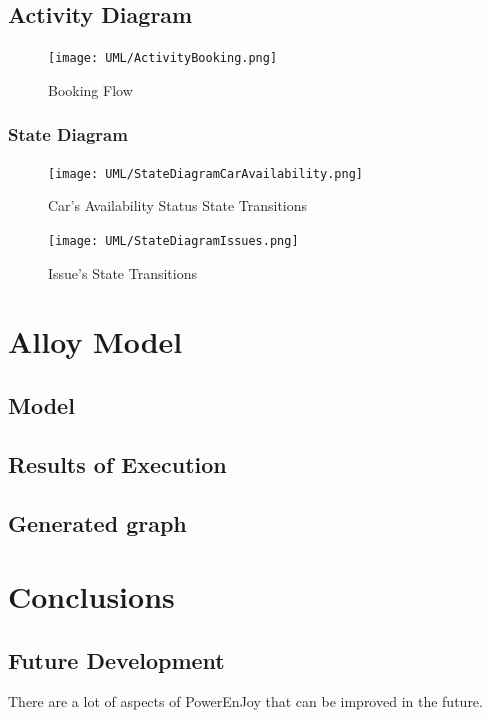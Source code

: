 \documentclass[11pt]{article} %
\newcommand{\pe}{PowerEnJoy }
\begin{document}
\subsection{Activity Diagram}
\begin{figure}[H]
	\centering
	\texttt{[image: UML/ActivityBooking.png]}
	\caption{Booking Flow}
\end{figure}


\subsubsection{State Diagram}
\begin{figure}[H]
	\centering
	\texttt{[image: UML/StateDiagramCarAvailability.png]}
	\caption{Car's Availability Status State Transitions}
\end{figure}
\begin{figure}[H]
	\centering
	\texttt{[image: UML/StateDiagramIssues.png]}
	\caption{Issue's State Transitions}
\end{figure}



\newpage
\section{Alloy Model}

\subsection{Model}

\subsection{Results of Execution}

\subsection{Generated graph}



\newpage
\section{Conclusions}

\subsection{Future Development}
There are a lot of aspects of \pe that can be improved in the future.
\end{document}
